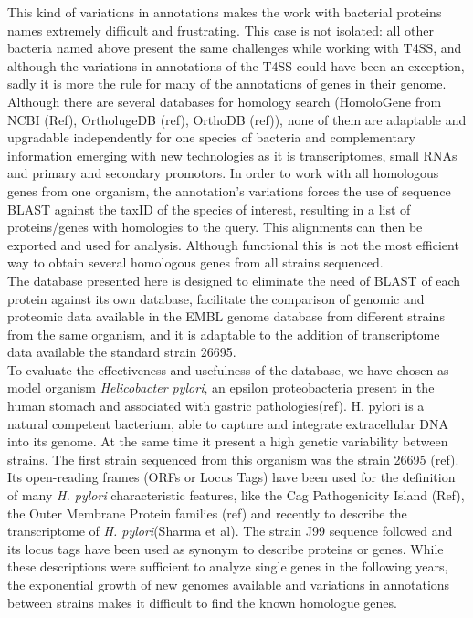 \documentclass[a4,center,fleqn]{NAR}
\begin{document}
This kind of variations in annotations makes the work with bacterial proteins names extremely difficult and frustrating. This case is not isolated: all other bacteria named above present the same challenges while working with T4SS, and although the variations in annotations of the T4SS could have been an exception, sadly it is more the rule for many of the annotations of genes in their genome.\\
Although there are several databases for homology search (HomoloGene from NCBI (Ref), OrtholugeDB (ref), OrthoDB (ref)), none of them are adaptable and upgradable independently for one species of bacteria and complementary information emerging with new technologies as it is transcriptomes, small RNAs and primary and secondary promotors. 
In order to work with all homologous genes from one organism, the annotation's variations forces the use of sequence BLAST against the taxID of the species of interest, resulting in a list of proteins/genes with homologies to the query. This alignments can then be exported and used for analysis. Although functional this is not the most efficient way to obtain several homologous genes from all strains sequenced.\\The database presented here is designed to eliminate the need of BLAST of each protein against its own database, facilitate the comparison of genomic and proteomic data available in the EMBL genome database from different strains from the same organism, and it is adaptable to the addition of transcriptome data available the standard strain 26695. \\
To evaluate the effectiveness and usefulness of the database, we have chosen as model organism \textit{Helicobacter pylori}, an epsilon proteobacteria present in the human stomach and associated with gastric pathologies(ref). H. pylori is a natural competent bacterium, able to capture and integrate extracellular DNA into its genome. At the same time it present a high genetic variability between strains. The first strain sequenced from this organism was the strain 26695 (ref). Its open-reading frames (ORFs or Locus Tags) have been used for the definition of many  \textit{H. pylori} characteristic features, like the Cag Pathogenicity Island (Ref), the Outer Membrane Protein families (ref) and recently to describe the transcriptome of \textit{H. pylori}(Sharma et al). The strain J99 sequence followed and its locus tags have been used as synonym to describe proteins or genes. While these descriptions were sufficient to analyze single genes in the following years, the exponential growth of new genomes available and variations in annotations between strains makes it difficult to find the known homologue genes.
\end{document}
